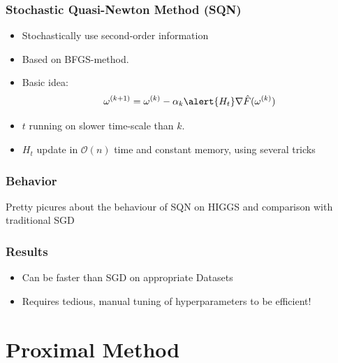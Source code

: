 \documentclass[10pt]{beamer}
\begin{document}
  \begin{frame}\frametitle{Stochastic Quasi-Newton Method (SQN)}
      \begin{itemize}
        \item \alert{Stochastically} use second-order information
        \item Based on BFGS-method.
        \pause
        \item Basic idea: $$ \omega^{(k+1)} = \omega^{(k)} - \alpha_k \alert{H_t} \nabla \hat F(\omega^{(k)})$$
        \pause
        \item $t$ running on slower time-scale than $k$. 
        \item $H_t$ update in $\mathcal O(n)$ time and constant memory, using several tricks
      \end{itemize}
  \end{frame}


  \begin{frame}
    \frametitle{Behavior}
      Pretty picures about the behaviour of SQN on HIGGS
      and comparison with traditional SGD
  \end{frame}

  \begin{frame}\frametitle{Results}
    \begin{itemize}
      \item Can be faster than SGD on appropriate Datasets
      \item Requires tedious, manual tuning of hyperparameters to be efficient!
    \end{itemize}
  
  \end{frame}

 \section{Proximal Method}
 
\end{document}
